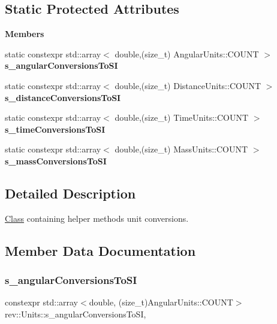 \subsection*{Static Protected Attributes}
\begin{Indent}\textbf{ Members}\par
\begin{DoxyCompactItemize}
\item 
static constexpr std\+::array$<$ double,(size\+\_\+t) Angular\+Units\+::\+C\+O\+U\+NT $>$ {\bfseries s\+\_\+angular\+Conversions\+To\+SI}
\item 
static constexpr std\+::array$<$ double,(size\+\_\+t) Distance\+Units\+::\+C\+O\+U\+NT $>$ {\bfseries s\+\_\+distance\+Conversions\+To\+SI}
\item 
static constexpr std\+::array$<$ double,(size\+\_\+t) Time\+Units\+::\+C\+O\+U\+NT $>$ {\bfseries s\+\_\+time\+Conversions\+To\+SI}
\item 
static constexpr std\+::array$<$ double,(size\+\_\+t) Mass\+Units\+::\+C\+O\+U\+NT $>$ {\bfseries s\+\_\+mass\+Conversions\+To\+SI}
\end{DoxyCompactItemize}
\end{Indent}


\subsection{Detailed Description}
\mbox{\hyperlink{struct_class}{Class}} containing helper methods unit conversions. 

\subsection{Member Data Documentation}
\mbox{\label{classrev_1_1_units_a1ae287c40776aae4662690a4a8b62d62}} 
\subsubsection{\texorpdfstring{s\_angularConversionsToSI}{s\_angularConversionsToSI}}
{\footnotesize\ttfamily constexpr std\+::array$<$double, (size\+\_\+t)Angular\+Units\+::\+C\+O\+U\+NT$>$ rev\+::\+Units\+::s\+\_\+angular\+Conversions\+To\+SI\hspace{0.3cm}{\ttfamily [static]}, {\ttfamily [protected]}}

